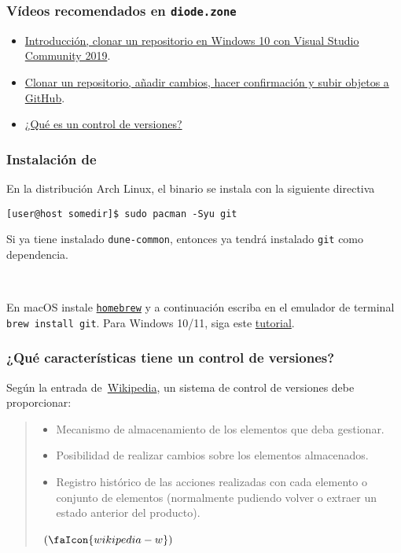 




\begin{frame}
	\frametitle{Vídeos recomendados en \texttt{diode.zone}~\diode{}}
	\begin{itemize}
		\item[\diode{}] \href{https://diode.zone/w/fd7db693-38be-46fd-871d-dfb545953231}{Introducción, clonar un repositorio en Windows 10 con Visual Studio Community 2019}.
		\item[\diode{}] \href{https://diode.zone/w/6c6997e0-73d9-4346-b9d3-6643edf5942a}{Clonar un repositorio, añadir cambios, hacer confirmación y subir objetos a GitHub}.
		\item[\diode{}] \href{https://diode.zone/w/7nbonxgvEr7FMTgkKrEu4N}{¿Qué es un control de versiones?}
	\end{itemize}
\end{frame}

\begin{frame}[fragile]
	\frametitle{Instalación de~\git{}}
	En la distribución Arch Linux, el binario se instala con la siguiente directiva
	\begin{verbatim}
[user@host somedir]$ sudo pacman -Syu git
    \end{verbatim}
	Si ya tiene instalado \lstinline|dune-common|, entonces ya tendrá instalado \lstinline|git| como dependencia.

	\

	En macOS instale \href{https://brew.sh}{\lstinline|homebrew|} y a continuación escriba en el emulador de terminal \lstinline|brew install git|. Para Windows 10/11, siga este \href{https://courses-2020-1.gitlab.io/abet-project/guideofuser.pdf}{\alert{tutorial}}.
\end{frame}

\begin{frame}
	\frametitle{¿Qué características tiene un control de versiones?}

	Según la entrada de~\href{https://es.wikipedia.org}{Wikipedia}, un sistema de control de versiones debe proporcionar:

	\begin{quote}\itshape
		\begin{itemize}
			\item Mecanismo de almacenamiento de los elementos que deba gestionar.
			\item Posibilidad de realizar cambios sobre los elementos almacenados.
			\item Registro histórico de las acciones realizadas con cada elemento o conjunto de elementos (normalmente pudiendo volver o extraer un estado anterior del producto).
		\end{itemize}
		\
		\noindent\hfill\color{DarkBlue}$\left(\faIcon{wikipedia-w}\right)$
	\end{quote}

\end{frame}

